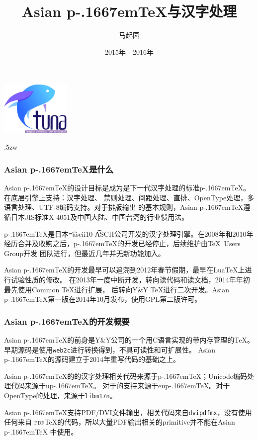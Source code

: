 \documentclass[dvipdfmx]{beamer}
\newcommand{\pTeX}{p\kern-.1667em\TeX}
\newcommand{\ptexng}{Asian \pTeX}
\begin{document}
\title{\bf Asian \pTeX 与汉字处理}
\author{马起园}
\date{2015年—2016年}
\begin{frame}
\maketitle
\begin{center}
\includegraphics[bb=0 0 255 197, width=9em]{tuna-logo.png}
\end{center}
\end{frame}
%
\parskip.5zw
%
\begin{frame}[fragile]
\frametitle{\ptexng 是什么}
\ptexng 的设计目标是成为是下一代汉字处理的标准\pTeX。在底层引擎上支持：汉字处理、
禁则处理、间距处理、直排、OpenType处理，多语言处理、UTF-8编码支持。对于排版输出
的基本规则，\ptexng 遵循日本JIS标准X 4051及中国大陆、中国台湾的行业惯用法。

\pTeX 是日本{\font\t=ascii10 \t ASCII}公司开发的汉字处理引擎。在2008年和2010年
经历合并及收购之后，\pTeX 的开发已经停止，后续维护由\TeX\ Users Group开发
团队进行，但最近几年并无新功能加入。

\ptexng 的开发最早可以追溯到2012年春节假期，最早在Lua\TeX 上进行试验性质的修改。
在2013年一度中断开发，转向读代码和读文档，2014年年初最先使用Common \TeX 进行扩展，
后转向Y\&Y \TeX 进行二次开发。\ptexng 第一版在2014年10月发布，使用GPL第二版许可。
\end{frame}
%
\begin{frame}[fragile]
\frametitle{\ptexng 的开发概要}

\ptexng 的前身是Y\&Y公司的一个用C语言实现的带内存管理的\TeX。
早期源码是使用{\texttt{web2c}}进行转换得到，不具可读性和可扩展性。
\ptexng 的源码建立于2014年重写代码的基础之上。

\ptexng 的的汉字处理相关代码来源于\pTeX；Unicode编码处理代码来源于u\pTeX。
对于的支持来源于eu\pTeX。对于OpenType的处理，来源于\texttt{libm17n}。

\ptexng 支持PDF/DVI文件输出，相关代码来自\texttt{dvipdfmx}，没有使用任何来自
{\textsc{pdf}\TeX}的代码，所以大量PDF输出相关的primitive并不能在\ptexng
中使用。
\end{frame}
%
\end{document}
